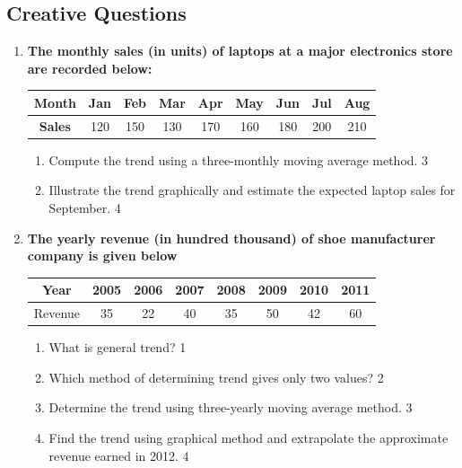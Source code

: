 \documentclass[a4paper,oneside]{book}
\begin{document}
\begin{enumerate}
\section{Creative Questions}
  \begin{enumerate}
  
  \item
\textbf{The monthly sales (in units) of laptops at a major electronics store are recorded below:} 

\begin{table}[h]
\centering
\begin{tabular}{c|cccccccc}
\textbf{Month} & Jan & Feb & Mar & Apr & May & Jun & Jul & Aug \\ \hline
\textbf{Sales} & 120 & 150 & 130 & 170 & 160 & 180 & 200 & 210
\end{tabular}
\end{table}

\begin{enumerate}
  \item  
  Compute the trend using a three-monthly moving average method. \hfill 3
  \item
  Illustrate the trend graphically and estimate the expected laptop sales for September. \hfill 4
\end{enumerate}


   \item
	  \textbf{The yearly revenue (in hundred thousand) of shoe manufacturer company is given below} 
  \begin{table}[h]
\centering
\begin{tabular}{cccccccc}
Year     & 2005 & 2006 & 2007 & 2008 & 2009 & 2010 & 2011 \\ \hline
Revenue & 35   & 22    & 40     & 35     & 50     & 42 & 60   
\end{tabular}
\end{table}
  
  \begin{enumerate}
    \item
	What is general trend? \hfill 1
    \item
	Which method of determining trend gives only two values? \hfill 2
    \item  
	Determine the trend using three-yearly moving average method. \hfill 3
    \item
	Find the trend using graphical method and extrapolate the approximate revenue earned in 2012. \hfill 4
  \end{enumerate}
  

\end{enumerate}
\end{enumerate}
\end{document}
